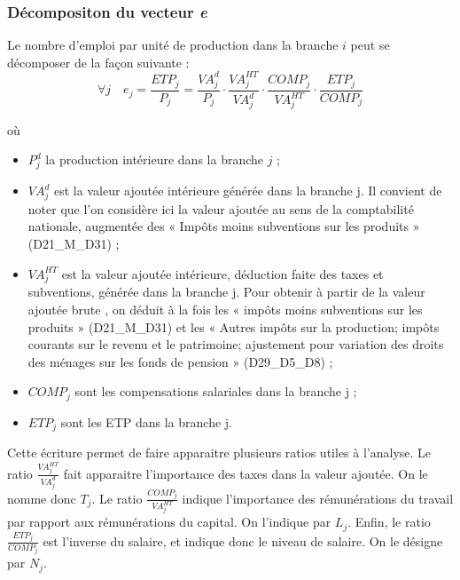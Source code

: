 \subsubsection{Décompositon du vecteur \textit{\textbf{e}}}

Le nombre d'emploi par unité de production dans la branche $i$ peut se décomposer de la façon suivante :
\begin{equation}
\forall j \quad e_j = \frac{ETP_j}{P_j} = \frac{VA^d_j}{P_j} \cdot \frac{VA^{HT}_j}{VA^d_j} \cdot \frac{COMP_j}{VA^{HT}_j} \cdot \frac{ETP_j}{COMP_j}
\label{decompo_e}
\end{equation}

où 
\begin{itemize}
	\item $P^d_j$ la production intérieure dans la branche $j$ ;
	\item $VA^d_j$ est la valeur ajoutée intérieure générée dans la branche j. Il convient de noter que l’on considère ici la valeur ajoutée au sens de la comptabilité nationale, augmentée des « Impôts moins subventions sur les produits » (D21\_M\_D31) ;
	\item $VA^{HT}_j$ est la valeur ajoutée intérieure, déduction faite des taxes et subventions, générée dans la branche j. Pour obtenir  à partir de la valeur ajoutée brute , on déduit à la fois les « impôts moins subventions sur les produits » (D21\_M\_D31) et les « Autres impôts sur la production; impôts courants sur le revenu et le patrimoine; ajustement pour variation des droits des ménages sur les fonds de pension » (D29\_D5\_D8) ;
	\item $COMP_j$ sont les compensations salariales dans la branche j ;
	\item $ETP_j$ sont les ETP dans la branche j.
\end{itemize}
Cette écriture permet de faire apparaitre plusieurs ratios utiles à l'analyse. Le ratio $\frac{VA^{HT}_j}{VA^d_j}$ fait apparaitre l'importance des taxes dans la valeur ajoutée. On le nomme donc $T_j$. Le ratio $ \frac{COMP_j}{VA^{HT}_j}$ indique l'importance des rémunérations du travail par rapport aux rémunérations du capital. On l'indique par $L_j$. Enfin, le ratio $\frac{ETP_j}{COMP_j}$ est l'inverse du salaire, et indique donc le niveau de salaire. On le désigne par $N_j$.

